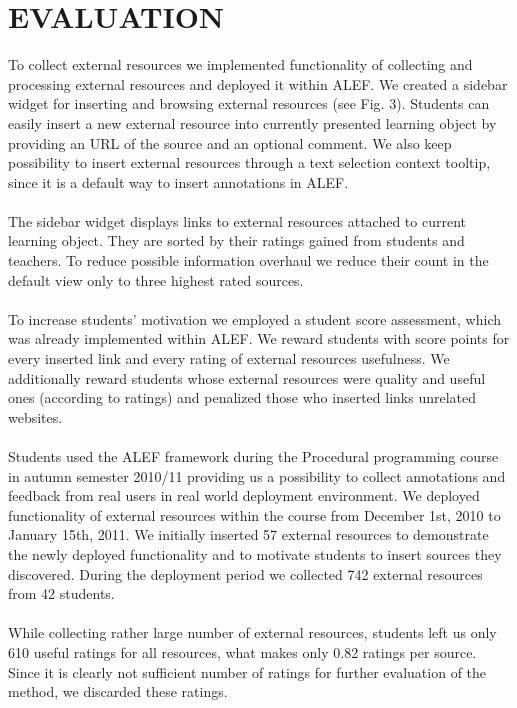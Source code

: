 \documentclass{llncs}
\begin{document}
\section{EVALUATION}
%  
To collect external resources we implemented functionality of collecting and processing external resources and deployed it within ALEF. We created a sidebar widget for inserting and browsing external resources (see Fig. 3). Students can easily insert a new external resource into currently presented learning object by providing an URL of the source and an optional comment. We also keep possibility to insert external resources through a text selection context tooltip, since it is a default way to insert annotations in ALEF.\\
\\
The sidebar widget displays links to external resources attached to current learning object. They are sorted by their ratings gained from students and teachers. To reduce possible information overhaul we reduce their count in the default view only to three highest rated sources.
\\
\\
To increase students’ motivation we employed a student score assessment, which was already implemented within ALEF. We reward students with score points for every inserted link and every rating of external resources usefulness. We additionally reward students whose external resources were quality and useful ones (according to ratings) and penalized those who inserted links unrelated websites.\\
\\
Students used the ALEF framework during the Procedural programming course in autumn semester 2010/11 providing us a possibility to collect annotations and feedback from real users in real world deployment environment. We deployed functionality of external resources within the course from December 1st, 2010 to January 15th, 2011. We initially inserted 57 external resources to demonstrate the newly deployed functionality and to motivate students to insert sources they discovered. During the deployment period we collected 742 external resources from 42 students.\\
\\
While collecting rather large number of external resources, students left us only 610 useful ratings for all resources, what makes only 0.82 ratings per source. Since it is clearly not sufficient number of ratings for further evaluation of the method, we discarded these ratings.\\
\end{document}

